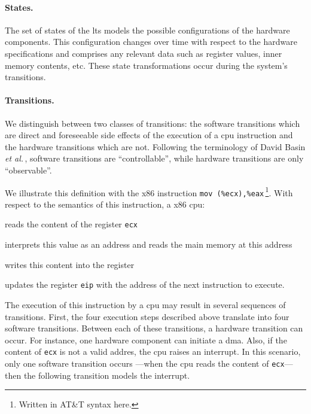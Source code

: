 \paragraph{States.}
%
The set of states of the \ac{lts} models the possible configurations of the
hardware components.
%
This configuration changes over time with respect to the hardware
specifications and comprises any relevant data such as register values, inner
memory contents, etc.
%
These state transformations occur during the system's transitions.

\paragraph{Transitions.}
%
We distinguish between two classes of transitions: the software transitions
which are direct and foreseeable side effects of the execution of a \ac{cpu}
instruction and the hardware transitions which are not.
%
Following the terminology of David Basin \emph{et
  al.}\,\cite{basin2013enforceable}, software transitions are ``controllable'',
while hardware transitions are only ``observable''.

We illustrate this definition with the x86 instruction \texttt{mov
  (\%ecx),\%eax}\,\footnote{Written in AT\&T syntax here.}.
%
With respect to the semantics of this instruction, a x86 \ac{cpu}:
%
\begin{inparaenum}[(1)]
\item reads the content of the register \texttt{ecx}
%
\item interprets this value as an address and reads the main memory at this
  address
%
\item writes this content into the register 
%
\item updates the register \texttt{eip} with the address of the next instruction
  to execute.
\end{inparaenum}
%
The execution of this instruction by a \ac{cpu} may result in several sequences
of transitions.
%
First, the four execution steps described above translate into four software
transitions.
%
Between each of these transitions, a hardware transition can occur.
%
For instance, one hardware component can initiate a \ac{dma}.
%
Also, if the content of \texttt{ecx} is not a valid addres, the \ac{cpu} raises
an interrupt.
%
In this scenario, only one software transition occurs ---when the \ac{cpu} reads
the content of \texttt{ecx}--- then the following transition models the
interrupt.

